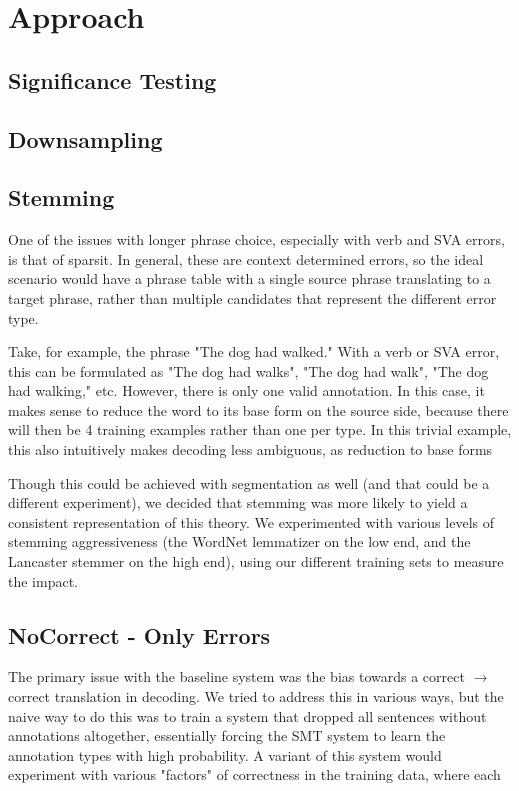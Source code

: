 \documentclass[11pt,letterpaper]{article}
\begin{document}
\section{Approach}
\subsection{Significance Testing}
\subsection{Downsampling}
\subsection{Stemming}


One of the issues with longer phrase choice, especially with verb and SVA errors, is that of sparsit. In general, these are context determined errors, so the ideal scenario would have a phrase table with a single source phrase translating to a target phrase, rather than multiple candidates that represent the different error type. 

Take, for example, the phrase "The dog had walked." With a verb or SVA error, this can be formulated as "The dog had walks", "The dog had walk", "The dog had walking," etc. However, there is only one valid annotation. In this case, it makes sense to reduce the word to its base form on the source side, because there will then be 4 training examples rather than one per type. In this trivial example, this also intuitively makes decoding less ambiguous, as reduction to base forms 

Though this could be achieved with segmentation as well (and that could be a different experiment), we decided that stemming was more likely to yield a consistent representation of this theory. We experimented with various levels of stemming aggressiveness (the WordNet lemmatizer on the low end, and the Lancaster stemmer on the high end), using our different training sets to measure the impact.

\subsection{NoCorrect - Only Errors}

The primary issue with the baseline system was the bias towards a correct $\rightarrow$ correct translation in decoding. We tried to address this in various ways, but the naive way to do this was to train a system that dropped all sentences without annotations altogether, essentially forcing the SMT system to learn the annotation types with high probability. A variant of this system would experiment with various "factors" of correctness in the training data, where each 
\end{document}
